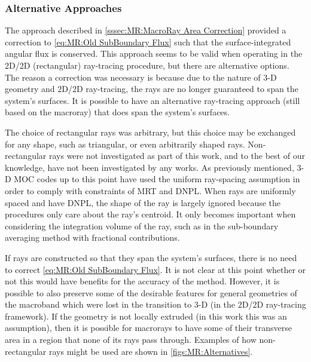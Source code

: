 {{{      \subsubsection{Alternative Approaches}{\label{sssec:MR:Alternative Approaches}
        The approach described in \cref{sssec:MR:MacroRay Area Correction} provided a correction to \cref{eq:MR:Old SubBoundary Flux} such that the surface-integrated angular flux is conserved.
        This approach seems to be valid when operating in the 2D/2D (rectangular) ray-tracing procedure, but there are alternative options.
        The reason a correction was necessary is because due to the nature of 3-D geometry and 2D/2D ray-tracing, the rays are no longer guaranteed to span the system's surfaces.
        It is possible to have an alternative ray-tracing approach (still based on the macroray) that does span the system's surfaces.

        The choice of rectangular rays was arbitrary, but this choice may be exchanged for any shape, such as triangular, or even arbitrarily shaped rays.
        Non-rectangular rays were not investigated as part of this work, and to the best of our knowledge, have not been investigated by any works.
        As previously mentioned, 3-D \ac{MOC} codes up to this point have used the uniform ray-spacing assumption in order to comply with constraints of \ac{MRT} and \ac{DNPL}.
        When rays are uniformly spaced and have \ac{DNPL}, the shape of the ray is largely ignored because the procedures only care about the ray's centroid.
        It only becomes important when considering the integration volume of the ray, such as in the sub-boundary averaging method with fractional contributions.

        If rays are constructed so that they span the system's surfaces, there is no need to correct \cref{eq:MR:Old SubBoundary Flux}.
        It is not clear at this point whether or not this would have benefits for the accuracy of the method.
        However, it is possible to also preserve some of the desirable features for general geometries of the macroband which were lost in the transition to 3-D (in the 2D/2D ray-tracing framework).
        If the geometry is not locally extruded (in this work this was an assumption), then it is possible for macrorays to have some of their transverse area in a region that none of its rays pass through.
        Examples of how non-rectangular rays might be used are shown in \cref{figs:MR:Alternatives}.

}}}}
